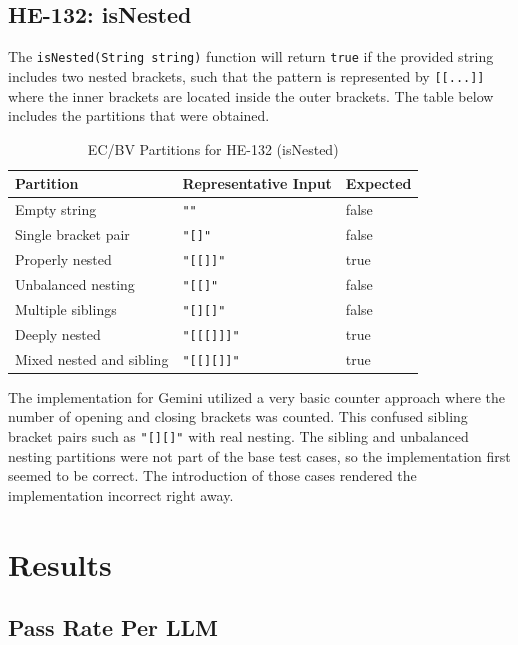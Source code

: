 \documentclass[journal]{IEEEtran}
\begin{document}
\subsection{HE-132: isNested}
The \texttt{isNested(String string)} function will return \texttt{true} if the provided string includes two nested brackets, such that the pattern is represented by \texttt{[[...]]} where the inner brackets are located inside the outer brackets. The table below includes the partitions that were obtained.

\begin{table}[h]
\centering
\caption{EC/BV Partitions for HE-132 (isNested)}
\label{tab:ec-132}
\begin{tabular}{lll}
\toprule
Partition & Representative Input & Expected \\
\midrule
Empty string            & \texttt{""}         & false \\
Single bracket pair     & \texttt{"[]"}       & false \\
Properly nested         & \texttt{"[[]]"}     & true  \\
Unbalanced nesting      & \texttt{"[[]"}      & false \\
Multiple siblings       & \texttt{"[][]"}     & false \\
Deeply nested           & \texttt{"[[[]]]"}   & true  \\
Mixed nested and sibling & \texttt{"[[][]]"}  & true  \\
\bottomrule
\end{tabular}
\end{table}

The implementation for Gemini utilized a very basic counter approach where the number of opening and closing brackets was counted. This confused sibling bracket pairs such as \texttt{"[][]"} with real nesting. The sibling and unbalanced nesting partitions were not part of the base test cases, so the implementation first seemed to be correct. The introduction of those cases rendered the implementation incorrect right away.

\section{Results}
\label{sec:results}

\subsection{Pass Rate Per LLM}
\end{document}
